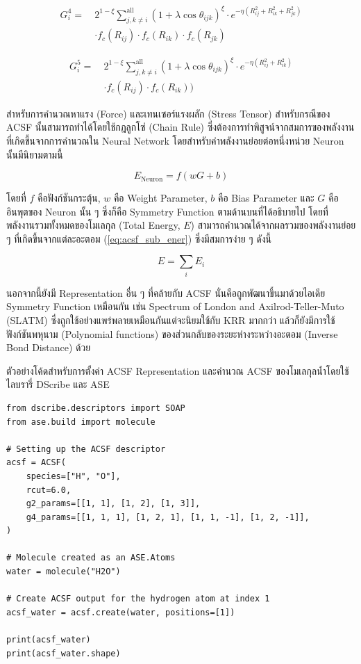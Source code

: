 \begin{align}
    G^{4}_{i} =~&2^{1 - \xi}\sum^{\text{all}}_{j,k \neq i} (1+\lambda \cos \theta_{ijk})^{\xi}
    \cdot e^{-\eta(R^{2}_{ij} + R^{2}_{ik} + R^{2}_{jk})} \nonumber \\
    & \cdot f_{c}(R_{ij}) \cdot f_{c}(R_{ik}) \cdot f_{c}(R_{jk})
\end{align}

\begin{align}
    G^{5}_{i} =~&2^{1 - \xi}\sum^{\text{all}}_{j,k \neq i} (1+\lambda \cos \theta_{ijk})^{\xi}
    \cdot e^{-\eta(R^{2}_{ij} + R^{2}_{ik})} \nonumber \\
    & \cdot f_{c}(R_{ij}) \cdot f_{c}(R_{ik}))
\end{align}

สำหรับการคำนวณหาแรง (Force) และเทนเซอร์แรงผลัก (Stress Tensor) สำหรับกรณีของ ACSF นั้นสามารถทำได้โดยใช้กฎลูกโซ่ (Chain Rule) 
ซึ่งต้องการทำพิสูจน์จากสมการของพลังงานที่เกิดขึ้นจากการคำนวณใน Neural Network โดยสำหรับค่าพลังงานย่อยต่อหนึ่งหน่วย Neuron นั้นมีนิยามตามนี้

\begin{equation}
    \label{eq:acsf_sub_ener}
    E_{\text{Neuron}} = f(w G + b) 
\end{equation}

\noindent โดยที่ $f$ คือฟังก์ชันกระตุ้น, $w$ คือ Weight Parameter, $b$ คือ Bias Parameter และ $G$ คืออินพุตของ Neuron นั้น ๆ 
ซึ่งก็คือ Symmetry Function ตามด้านบนที่ได้อธิบายไป โดยที่พลังงานรวมทั้งหมดของโมเลกุล (Total Energy, $E$) 
สามารถคำนวณได้จากผลรวมของพลังงานย่อย ๆ ที่เกิดขึ้นจากแต่ละอะตอม (\ref{eq:acsf_sub_ener}) ซึ่งมีสมการง่าย ๆ ดังนี้

\begin{equation}
    E = \sum_{i} E_{i}
\end{equation}

นอกจากนี้ยังมี Representation อื่น ๆ ที่คล้ายกับ ACSF นั่นคือถูกพัฒนาขึ้นมาด้วยไอเดีย Symmetry Function เหมือนกัน เช่น 
Spectrum of London and Axilrod-Teller-Muto (SLATM) ซึ่งถูกใช้อย่างแพร่พลายเหมือนกันแต่จะนิยมใช้กับ KRR มากกว่า%
\autocite{faber2018,huang2020} แล้วก็ยังมีการใช้ฟังก์ชันพหุนาม (Polynomial functions) ของส่วนกลับของระยะห่างระหว่างอะตอม
(Inverse Bond Distance) ด้วย\autocite{kwac2019,musil2021}

ตัวอย่างโค้ดสำหรับการตั้งค่า ACSF Representation และคำนวณ ACSF ของโมเลกุลน้ำโดยใช้ไลบรารี่ DScribe และ ASE

\begin{lstlisting}[style=MyPython]
from dscribe.descriptors import SOAP
from ase.build import molecule

# Setting up the ACSF descriptor
acsf = ACSF(
    species=["H", "O"],
    rcut=6.0,
    g2_params=[[1, 1], [1, 2], [1, 3]],
    g4_params=[[1, 1, 1], [1, 2, 1], [1, 1, -1], [1, 2, -1]],
)

# Molecule created as an ASE.Atoms
water = molecule("H2O")

# Create ACSF output for the hydrogen atom at index 1
acsf_water = acsf.create(water, positions=[1])

print(acsf_water)
print(acsf_water.shape)
\end{lstlisting}

